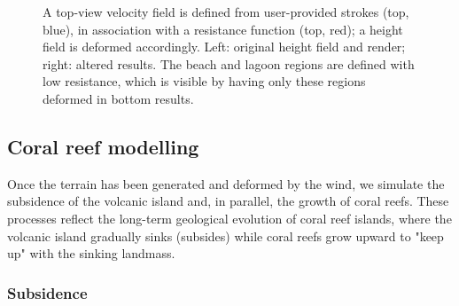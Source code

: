 \begin{figure}
    \caption{A top-view velocity field is defined from user-provided strokes (top, blue), in association with a resistance function (top, red); a height field is deformed accordingly. Left: original height field and render; right: altered results. The beach and lagoon regions are defined with low resistance, which is visible by having only these regions deformed in bottom results.}
    \label{fig:coral-island-wind-effect-result}
\end{figure}

\subsection{Coral reef modelling}
\label{sec:coral-island-coral-reef}


Once the terrain has been generated and deformed by the wind, we simulate the subsidence of the volcanic island and, in parallel, the growth of coral reefs. These processes reflect the long-term geological evolution of coral reef islands, where the volcanic island gradually sinks (subsides) while coral reefs grow upward to "keep up" with the sinking landmass.

\subsubsection{Subsidence}
\label{sec:coral-island-subsidence}

